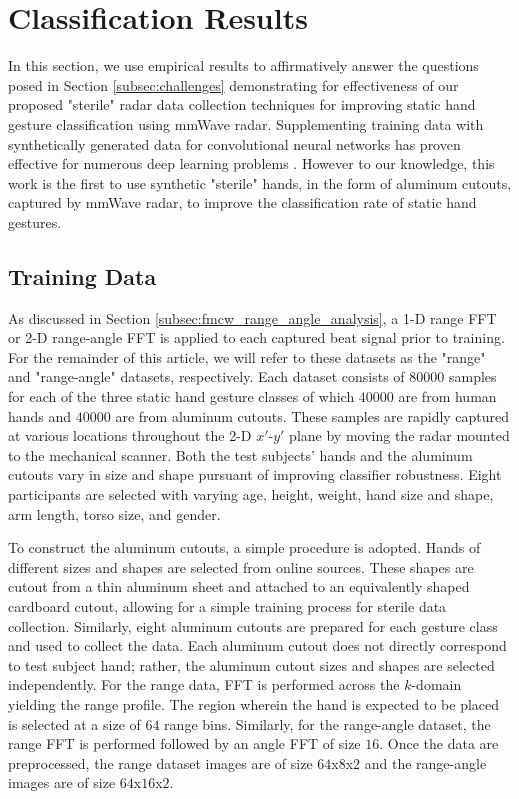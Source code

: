\documentclass{ieeeaccess}
\begin{document}
\section{Classification Results}
\label{sec:classification_results}
In this section, we use empirical results to affirmatively answer the questions posed in Section \ref{subsec:challenges} demonstrating for effectiveness of our proposed "sterile" radar data collection techniques for improving static hand gesture classification using mmWave radar. Supplementing training data with synthetically generated data for convolutional neural networks has proven effective for numerous deep learning problems \cite{synthetic_data:face,synthetic_data:FaultSeg3D,synthetic_data:fish,synthetic_data:license_plate}. However to our knowledge, this work is the first to use synthetic "sterile" hands, in the form of aluminum cutouts, captured by mmWave radar, to improve the classification rate of static hand gestures.

\subsection{Training Data}
\label{subsec:training_data}
As discussed in Section \ref{subsec:fmcw_range_angle_analysis}, a 1-D range FFT or 2-D range-angle FFT is applied to each captured beat signal prior to training. For the remainder of this article, we will refer to these datasets as the "range" and "range-angle" datasets, respectively. Each dataset consists of $80000$ samples for each of the three static hand gesture classes of which $40000$ are from human hands and $40000$ are from aluminum cutouts. These samples are rapidly captured at various locations throughout the 2-D $x'$-$y'$ plane by moving the radar mounted to the mechanical scanner. Both the test subjects' hands and the aluminum cutouts vary in size and shape pursuant of improving classifier robustness. Eight participants are selected with varying age, height, weight, hand size and shape, arm length, torso size, and gender. 

To construct the aluminum cutouts, a simple procedure is adopted. Hands of different sizes and shapes are selected from online sources. These shapes are cutout from a thin aluminum sheet and attached to an equivalently shaped cardboard cutout, allowing for a simple training process for sterile data collection. Similarly, eight aluminum cutouts are prepared for each gesture class and used to collect the data. Each aluminum cutout does not directly correspond to test subject hand; rather, the aluminum cutout sizes and shapes are selected independently. For the range data, FFT is performed across the $k$-domain yielding the range profile. The region wherein the hand is expected to be placed is selected at a size of $64$ range bins. Similarly, for the range-angle dataset, the range FFT is performed followed by an angle FFT of size $16$. Once the data are preprocessed, the range dataset images are of size $64$x$8$x$2$ and the range-angle images are of size $64$x$16$x$2$. 
\end{document}
